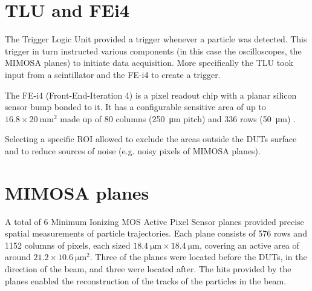 

\section{TLU and FEi4}

The Trigger Logic Unit provided a trigger whenever a particle was detected. This trigger in turn instructed various components (in this case the oscilloscopes, the MIMOSA planes) to initiate data acquisition. More specifically the TLU took input from a scintillator and the FE-i4 to create a trigger.

The FE-i4 (Front-End-Iteration 4) is a pixel readout chip with a planar silicon sensor bump bonded to it. It has a configurable sensitive area of up to \(\num{16.8} \times \qty{20}{\milli\meter^2}\) made up of 80 columns (\qty{250}{\micro\meter} pitch) and 336 rows (\qty{50}{\micro\meter}) \cite{Obermann:2014goa}. 

Selecting a specific ROI allowed to exclude the areas outside the DUTs surface and to reduce sources of noise (e.g. noisy pixels of MIMOSA planes). %
 
\section{MIMOSA planes}

A total of 6 Minimum Ionizing MOS Active Pixel Sensor planes \cite{Hu-Guo:2010lrq} provided precise spatial measurements of particle trajectories. Each plane consists of 576 rows and 1152 columns of pixels, each sized \(\qty{18.4}{\micro\meter} \times \qty{18.4}{\micro\meter}\), covering an active area of around \(\num{21.2} \times \qty{10.6}{\micro\meter^2}\). Three of the planes were located before the DUTs, in the direction of the beam, and three were located after. The hits provided by the planes enabled the reconstruction of the tracks of the particles in the beam.

